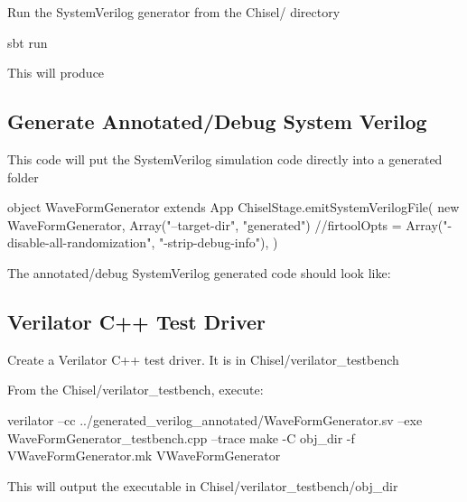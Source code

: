 Run the SystemVerilog generator from the Chisel/ directory
\begin{bashcode}
sbt run
\end{bashcode}

This will produce

\subsection{Generate Annotated/Debug System Verilog}
This code will put the SystemVerilog simulation code directly into a generated folder
\begin{chiselcode}
object WaveFormGenerator extends App {
  ChiselStage.emitSystemVerilogFile(
    new WaveFormGenerator,
    Array("--target-dir", "generated")
    //firtoolOpts = Array("-disable-all-randomization", "-strip-debug-info"),
  )
}
\end{chiselcode}

The annotated/debug SystemVerilog generated code should look like:

\subsection{Verilator C++ Test Driver} \label{sub:verilator_test_driver}
Create a Verilator C++ test driver. It is in Chisel/verilator\_testbench

From the Chisel/verilator\_testbench, execute:
\begin{bashcode}
verilator --cc ../generated_verilog_annotated/WaveFormGenerator.sv --exe WaveFormGenerator_testbench.cpp --trace
make -C obj_dir -f VWaveFormGenerator.mk VWaveFormGenerator   
\end{bashcode}

This will output the executable in Chisel/verilator\_testbench/obj\_dir

